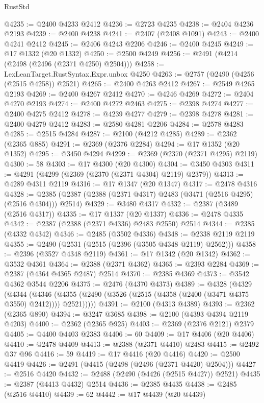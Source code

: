\begin{lexlean}{RustStd}
\begin{coremodule}
@4235 := @2400 @4233 @2412
@4236 := @2723 @4235
@4238 := @2404 @4236 @2193
@4239 := @2400 @4238
@4241 := @2407 (@2408 @1091)
@4243 := @2400 @4241 @2412
@4245 := @2406 @4243 @2206
@4246 := @2400 @4245
@4249 := @17 @1332 (@20 @1332)
@4250 := @2500 @4249
@4256 := @2491 (@4214 (@2498 (@2496 (@2371 @4250) @2504)))
@4258 := LexLeanTarget.RustSyntax.Expr.unbox @4250
@4263 := @2757 (@2490 (@4256 (@2515 @4258)) @2521)
@4265 := @2400 @4263 @2412
@4267 := @2549 @4265 @2193
@4269 := @2400 @4267 @2412
@4270 := @4246 @4269
@4272 := @2404 @4270 @2193
@4274 := @2400 @4272 @2463
@4275 := @2398 @4274
@4277 := @2400 @4275 @2412
@4278 := @4239 @4277
@4279 := @2398 @4278
@4281 := @2400 @4279 @2412
@4283 := @2580 @4281 @2206
@4284 := @2578 @4283
@4285 := @2515 @4284
@4287 := @2100 (@4212 @4285)
@4289 := @2362 (@2365 @885)
@4291 := @2369 (@2376 @2284)
@4294 := @17 @1352 (@20 @1352)
@4295 := @3450 @4294
@4299 := @2369 (@2370 (@2371 @4295) @2119)
@4300 := 58
@4303 := @17 @4300 (@20 @4300)
@4304 := @3450 @4303
@4311 := @4291 (@4299 (@2369 (@2370 (@2371 @4304) @2119) @2379))
@4313 := @4289 @4311 @2119
@4316 := @17 @1347 (@20 @1347)
@4317 := @2478 @4316
@4328 := @2385 (@2387 (@2388 (@2371 @4317) @2483 (@3471 (@2516 @4295) (@2516 @4304))) @2514)
@4329 := @3480 @4317
@4332 := @2387 (@3489 (@2516 @4317))
@4335 := @17 @1337 (@20 @1337)
@4336 := @2478 @4335
@4342 := @2387 (@2388 (@2371 @4336) @2483 @2550) @2514
@4344 := @2385 (@4332 @4342)
@4346 := @2485 (@3502 @4336)
@4348 := @2338 @2119 @2119
@4355 := @2490 (@2531 (@2515 (@2396 (@3505 @4348 @2119) @2562)))
@4358 := @2396 (@3527 @4348 @2119)
@4361 := @17 @1342 (@20 @1342)
@4362 := @3532 @4361
@4364 := @2388 (@2371 @4362)
@4365 := @2393 @2284
@4369 := @2387 (@4364 @4365 @2487) @2514
@4370 := @2385 @4369
@4373 := @3542 @4362 @3544 @2206
@4375 := @2476 (@4370 @4373)
@4389 := @4328
    (@4329
      (@4344
        (@4346 (@4355 (@2490 (@3526 (@2515 (@4358 (@2400 (@3471 @4375 @3550) @2412)))) @2521)))))
@4391 := @2100 (@4313 @4389)
@4393 := @2362 (@2365 @890)
@4394 := @3247 @3685
@4398 := @2100 (@4393 @4394 @2119 @4203)
@4400 := @2362 (@2365 @925)
@4403 := @2369 (@2376 @2121) @2379
@4405 := @4400 @4403 @2383
@4406 := 60
@4409 := @17 @4406 (@20 @4406)
@4410 := @2478 @4409
@4413 := @2388 (@2371 @4410) @2483
@4415 := @2492 @37 @96
@4416 := 59
@4419 := @17 @4416 (@20 @4416)
@4420 := @2500 @4419
@4426 := @2491 (@4415 (@2498 (@2496 (@2371 @4420) @2504)))
@4427 := @2516 @4420
@4432 := @2488 (@2490 (@4426 (@2515 @4427)) @2521)
@4435 := @2387 (@4413 @4432) @2514
@4436 := @2385 @4435
@4438 := @2485 (@2516 @4410)
@4439 := 62
@4442 := @17 @4439 (@20 @4439)

\end{coremodule}
\end{lexlean}
